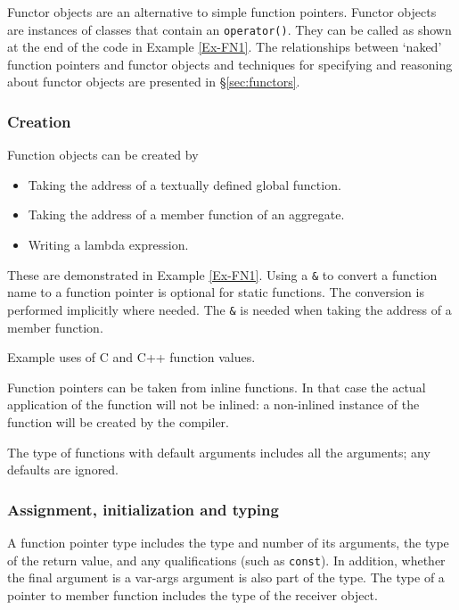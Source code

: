 Functor objects are an alternative to simple function pointers.
Functor objects are instances of classes that contain an 
\lstinline|operator()|. 
They can be called as shown at the end
of the code in Example \ref{Ex-FN1}. 
The relationships between
`naked' function pointers and functor objects and techniques for 
specifying and reasoning about functor objects are presented in \S\ref{sec:functors}.

\subsubsection{Creation}

Function objects can be created by
\begin{itemize}[noitemsep,nolistsep]
	\item Taking the address of a textually defined global function.
	\item Taking the address of a member function of an aggregate.
	\item Writing a lambda expression.
\end{itemize}
These are demonstrated in Example \ref{Ex-FN1}.
Using a \lstinline|&| to convert a function name to a function
pointer is optional for static functions. The conversion is performed implicitly where needed. The \lstinline|&| is needed when taking the address
of a member function.
\begin{example}
	 \label{Ex-FN1}
	Example uses of C and C++ function values.
\end{example}

Function pointers can be taken from inline functions. In that case 
the actual application of the function will not be inlined: a 
non-inlined instance of the function will be created by the compiler.

The type of functions with default arguments includes all the arguments; any defaults are ignored.

\subsubsection{Assignment, initialization and typing}
A function pointer type includes the type and number of its arguments, the type of the return value, and any qualifications (such as 
\lstinline|const|). 
In addition, whether the final argument is a var-args
argument is also part of the type.
The type of a pointer to member function includes the type of the receiver object.

